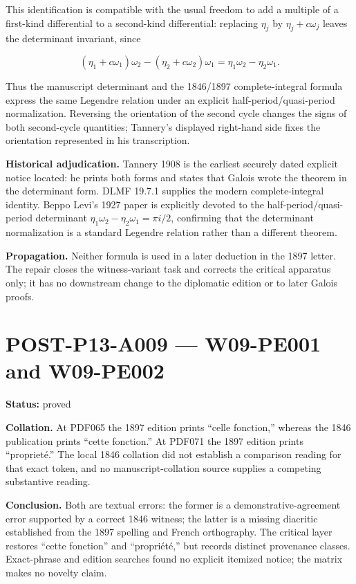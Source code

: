 \documentclass[
  10pt,
  a4paper,
]{scrreprt}
\begin{document}
This identification is compatible with the usual freedom to add a
multiple of a first-kind differential to a second-kind differential:
replacing \(\eta_j\) by \(\eta_j+c\omega_j\) leaves the determinant
invariant, since

\[
(\eta_1+c\omega_1)\omega_2-(\eta_2+c\omega_2)\omega_1
 =\eta_1\omega_2-\eta_2\omega_1.
\]

Thus the manuscript determinant and the 1846/1897 complete-integral
formula express the same Legendre relation under an explicit
half-period/quasi-period normalization. Reversing the orientation of the
second cycle changes the signs of both second-cycle quantities;
Tannery's displayed right-hand side fixes the orientation represented in
his transcription.

\textbf{Historical adjudication.} Tannery 1908 is the earliest securely
dated explicit notice located: he prints both forms and states that
Galois wrote the theorem in the determinant form. DLMF 19.7.1 supplies
the modern complete-integral identity. Beppo Levi's 1927 paper is
explicitly devoted to the half-period/quasi-period determinant
\(\eta_1\omega_2-\eta_2\omega_1=\pi i/2\), confirming that the
determinant normalization is a standard Legendre relation rather than a
different theorem.

\textbf{Propagation.} Neither formula is used in a later deduction in
the 1897 letter. The repair closes the witness-variant task and corrects
the critical apparatus only; it has no downstream change to the
diplomatic edition or to later Galois proofs.

\section{POST-P13-A009 --- W09-PE001 and
W09-PE002}\label{post-p13-a009-w09-pe001-and-w09-pe002}

\textbf{Status:} proved

\textbf{Collation.} At PDF065 the 1897 edition prints ``celle
fonction,'' whereas the 1846 publication prints ``cette fonction.'' At
PDF071 the 1897 edition prints ``proprieté.'' The local 1846 collation
did not establish a comparison reading for that exact token, and no
manuscript-collation source supplies a competing substantive reading.

\textbf{Conclusion.} Both are textual errors: the former is a
demonstrative-agreement error supported by a correct 1846 witness; the
latter is a missing diacritic established from the 1897 spelling and
French orthography. The critical layer restores ``cette fonction'' and
``propriété,'' but records distinct provenance classes. Exact-phrase and
edition searches found no explicit itemized notice; the matrix makes no
novelty claim.
\end{document}
